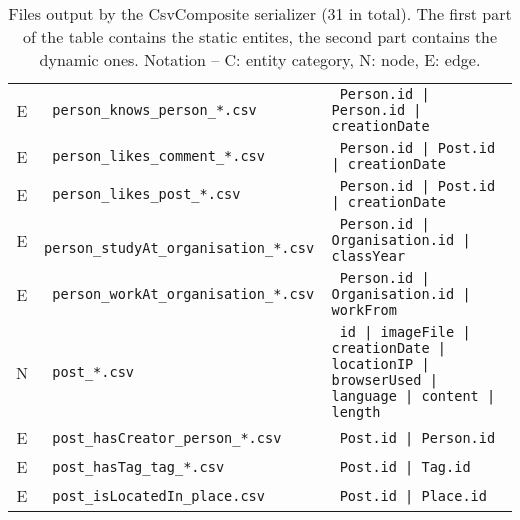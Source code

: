 \begin{table}[htb]
\begin{tabularx}{\linewidth}{|>{\sffamily}c|>{\tt}l|>{\tt}X|}
        E                    & person\_knows\_person\_*.csv            & Person.id | Person.id | creationDate                                                                       \\
        E                    & person\_likes\_comment\_*.csv           & Person.id | Post.id | creationDate                                                                         \\
        E                    & person\_likes\_post\_*.csv              & Person.id | Post.id | creationDate                                                                         \\
        E                    & person\_studyAt\_organisation\_*.csv    & Person.id | Organisation.id | classYear                                                                    \\
        E                    & person\_workAt\_organisation\_*.csv     & Person.id | Organisation.id | workFrom                                                                     \\
        \hline
        N                    & post\_*.csv                             & id | imageFile | creationDate | locationIP | browserUsed | language | content | length                     \\
        E                    & post\_hasCreator\_person\_*.csv         & Post.id | Person.id                                                                                        \\
        E                    & post\_hasTag\_tag\_*.csv                & Post.id | Tag.id                                                                                           \\
        E                    & post\_isLocatedIn\_place.csv            & Post.id | Place.id                                                                                         \\
        \hline
    \end{tabularx}
    \caption{Files output by the CsvComposite serializer (31 in total). The first part of the table contains the static entites, the second part contains the dynamic ones.
        Notation -- \textsf{C}: entity category, \textsf{N}: node, \textsf{E}: edge.}
    \label{table:csv_composite}
\end{table}
